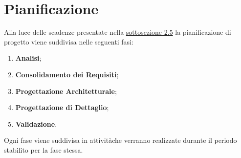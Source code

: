 \section{Pianificazione}
Alla luce delle scadenze presentate nella \hyperlink{scadenze}{sottosezione 2.5} la pianificazione di progetto viene suddivisa nelle seguenti fasi:
\begin{enumerate}
	\item \textbf{Analisi};
	\item \textbf{Consolidamento dei Requisiti};
	\item \textbf{Progettazione Architetturale};
	\item \textbf{Progettazione di Dettaglio};
	\item \textbf{Validazione}.
\end{enumerate}
Ogni fase viene suddivisa in attività\glosp che verranno realizzate durante il 
periodo stabilito per la fase stessa. 
